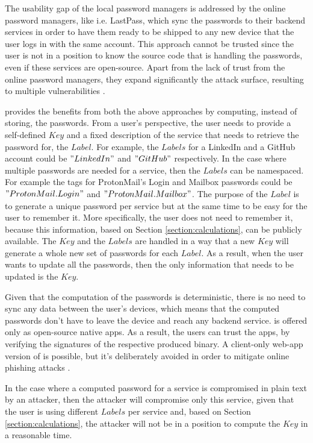 \documentclass{sig-alternate}
\begin{document}
The usability gap of the local password managers is addressed by the online password
managers, like i.e. LastPass, which sync the passwords to their backend services
in order to have them ready to be shipped to any new device that the user logs in
with the same account. This approach cannot be trusted since the user is not in
a position to know the source code that is handling the passwords, even if these
services are open-source. Apart from the lack of trust from the online password
managers, they expand significantly the attack surface, resulting to multiple
vulnerabilities \cite{li2014emperor}.

\ours provides the benefits from both the above approaches by computing, instead of
storing, the passwords. From a user's perspective, the user needs to provide a self-defined $Key$
and a fixed description of the service that needs to retrieve the password for, the $Label$.
For example, the $Labels$ for a LinkedIn and a GitHub account could be $"LinkedIn"$
and $"GitHub"$ respectively. In the case where multiple passwords are needed for a service,
then the $Labels$ can be namespaced. For example the tags for ProtonMail's Login
and Mailbox passwords could be $"ProtonMail.Login"$ and $"ProtonMail.Mailbox"$.
The purpose of the $Label$ is to generate a unique password per service but at the same time
to be easy for the user to remember it. More specifically, the user does not need to remember it,
because this information, based on Section \ref{section:calculations}, can be publicly available.
The $Key$ and the $Labels$ are handled in a way that a new $Key$ will generate
a whole new set of passwords for each $Label$. As a result, when the user wants
 to update all the passwords, then the only information that needs to be updated is the $Key$.

Given that the computation of the passwords is deterministic, there is no need to sync any data
between the user's devices, which means that the computed passwords don't have to
leave the device and reach any backend service. \ours is offered only as open-source
native apps. As a result, the users can trust the \ours apps, by verifying the signatures of the respective produced binary.
A client-only web-app version of \ours is possible, but it's deliberately
avoided in order to mitigate online phishing attacks \cite{chiasson2006usability}.

In the case where a computed password for a service is compromised in plain text by an attacker, 
then the attacker will compromise only this service, given that
the user is using different $Labels$ per service and, based on Section
\ref{section:calculations}, the attacker will not be in a position to compute the $Key$ in a reasonable time.
\end{document}

